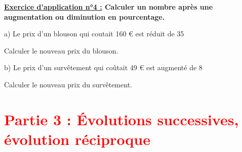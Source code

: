 \documentclass[12pt]{article}
\begin{document}
\begin{mdframed}[
    linewidth=1pt,
    linecolor=RoyalBlue,
    innertopmargin=10pt,
    innerbottommargin=10pt
]
{\color{RoyalBlue}\textbf{\underline{Exercice d'application n°4 :}
Calculer un nombre après une augmentation ou diminution en pourcentage.}}

\vspace{5pt}
\hspace{1cm} a) Le prix d'un blouson qui coutait 160 € est réduit de 35 %

\hspace{1.5cm} Calculer le nouveau prix du blouson.

\hspace{1cm} b) Le prix d'un survêtement qui coûtait 49 € est augmenté de 8 %

\hspace{1.5cm} Calculer le nouveau prix du survêtement.

\vspace{0.5cm}
{\color{black!30}\dotfill}

\vspace{0.5cm}
{\color{black!30}\dotfill}

\vspace{0.5cm}
{\color{black!30}\dotfill}

\vspace{0.5cm}
{\color{black!30}\dotfill}

\vspace{0.5cm}
{\color{black!30}\dotfill}

\vspace{0.5cm}
{\color{black!30}\dotfill}

\vspace{0.5cm}
{\color{black!30}\dotfill}

\vspace{0.5cm}
{\color{black!30}\dotfill}

\vspace{0.5cm}
{\color{black!30}\dotfill}

\end{mdframed}



\vspace{20pt}


\section*{\textcolor{red}{Partie 3 : Évolutions successives, évolution réciproque}}
\end{document}
